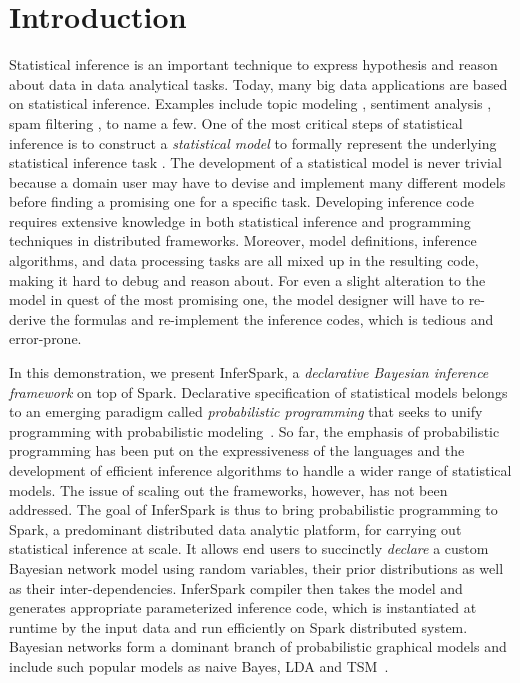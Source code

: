 
\section{Introduction}
\label{sec:intro}

Statistical inference is an important technique to express hypothesis and
reason about data in data analytical tasks.  Today, many big data applications
are based on statistical inference.  Examples include topic modeling
\cite{blei2003latent,Titov2008a}, sentiment analysis \cite{Titov2008b,
Jo2011,tsm}, spam filtering \cite{spam}, to name a few.  One of the most 
critical steps of statistical inference is to construct 
a \emph{statistical model} to
formally represent the underlying statistical inference task \cite{cox}. The
development of a statistical model is never trivial because a domain user may
have to devise and implement many  different models before finding a promising
one for a specific task. Developing inference code requires extensive
knowledge in both statistical inference and programming techniques in
distributed frameworks.  Moreover, model definitions, inference algorithms,
and data processing tasks are all mixed up in the resulting code, making it
hard to debug and reason about.  For even a slight alteration to the model in
quest of the most promising one, the model designer will have to re-derive the
formulas and re-implement the inference codes, which is tedious and
error-prone. 

In this demonstration, we present InferSpark, a \emph{declarative Bayesian
inference framework} on top of Spark. Declarative specification of statistical
models belongs to an emerging paradigm called {\em probabilistic programming}
that seeks to unify programming with probabilistic modeling~\cite{pp}.  So far,
the emphasis of probabilistic programming has been put on the expressiveness of
the languages and the development of efficient inference algorithms to handle a
wider range of statistical models. The issue of scaling out the frameworks,
however, has not been addressed. The goal of InferSpark is thus to bring
probabilistic programming to Spark, a predominant distributed data analytic
platform, for carrying out statistical inference at scale.  It allows end users
to succinctly {\em declare} a custom Bayesian network model using random
variables, their prior distributions as well as their inter-dependencies.
InferSpark compiler then takes the model and generates appropriate
parameterized inference code, which is instantiated at runtime by the input
data and run efficiently on Spark distributed system.  Bayesian networks form a
dominant branch of probabilistic graphical models and include such popular
models as naive Bayes, LDA and TSM~\cite{tsm}.  

